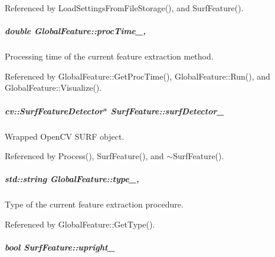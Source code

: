 Referenced by Load\-Settings\-From\-File\-Storage(), and Surf\-Feature().

\hypertarget{group___feature_extractor_aa3306975b929f5503dac51829f9e04a0}{
\subparagraph[{proc\-Time\-\_\-}]{\setlength{\rightskip}{0pt plus 5cm}double Global\-Feature\-::proc\-Time\-\_\-\hspace{0.3cm}{\ttfamily [protected]}, {\ttfamily [inherited]}}}\label{group___feature_extractor_aa3306975b929f5503dac51829f9e04a0}


Processing time of the current feature extraction method. 



Referenced by Global\-Feature\-::\-Get\-Proc\-Time(), Global\-Feature\-::\-Run(), and Global\-Feature\-::\-Visualize().

\hypertarget{group___feature_extractor_a191dd9737bd6dc754e43912bb3aad219}{
\subparagraph[{surf\-Detector\-\_\-}]{\setlength{\rightskip}{0pt plus 5cm}cv\-::\-Surf\-Feature\-Detector$\ast$ Surf\-Feature\-::surf\-Detector\-\_\-\hspace{0.3cm}{\ttfamily [private]}}}\label{group___feature_extractor_a191dd9737bd6dc754e43912bb3aad219}


Wrapped Open\-C\-V S\-U\-R\-F object. 



Referenced by Process(), Surf\-Feature(), and $\sim$\-Surf\-Feature().

\hypertarget{group___feature_extractor_ad467857c4bc3d0fe65ba29e3b8f7c796}{
\subparagraph[{type\-\_\-}]{\setlength{\rightskip}{0pt plus 5cm}std\-::string Global\-Feature\-::type\-\_\-\hspace{0.3cm}{\ttfamily [protected]}, {\ttfamily [inherited]}}}\label{group___feature_extractor_ad467857c4bc3d0fe65ba29e3b8f7c796}


Type of the current feature extraction procedure. 



Referenced by Global\-Feature\-::\-Get\-Type().

\hypertarget{group___feature_extractor_a4900461472b4f6707ce0db3bde65bda2}{
\subparagraph[{upright\-\_\-}]{\setlength{\rightskip}{0pt plus 5cm}bool Surf\-Feature\-::upright\-\_\-\hspace{0.3cm}{\ttfamily [private]}}}\label{group___feature_extractor_a4900461472b4f6707ce0db3bde65bda2}


